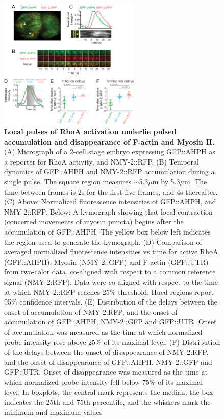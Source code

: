 \begin{figure}[!htbp]
\centering
\includegraphics[width=0.6\textwidth]{pulse/Figure2-4}

\caption{\label{fig:224}\textbf{Local pulses of RhoA activation underlie pulsed accumulation and disappearance of F-actin and Myosin II.} (A) Micrograph of a 2-cell stage embryo expressing GFP::AHPH as a reporter for RhoA activity, and NMY-2::RFP. (B) Temporal dynamics of GFP::AHPH and NMY-2::RFP accumulation during a single pulse. The square region measures $\sim$5.3$\mu$m by 5.3$\mu$m. The time between frames is 2s for the first five frames, and 4s thereafter. (C) Above: Normalized fluorescence intensities of GFP::AHPH, and NMY-2::RFP. Below: A kymograph showing that local contraction (concerted movements of myosin puncta) begins after the accumulation of GFP::AHPH. The yellow box below left indicates the region used to generate the kymograph. (D) Comparison of averaged normalized fluorescence intensities vs time for active RhoA (GFP::AHPH), Myosin (NMY-2::GFP) and F-actin (GFP::UTR) from two-color data, co-aligned with respect to a common reference signal (NMY-2:RFP). Data were co-aligned with respect to the time at which NMY-2::RFP reaches 25$\%$ threshold. Hued regions report 95$\%$ confidence intervals. (E) Distribution of the delays between the onset of accumulation of NMY-2:RFP, and the onset of accumulation of GFP::AHPH, NMY-2::GFP and GFP::UTR. Onset of accumulation was measured as the time at which normalized probe intensity rose above 25$\%$ of its maximal level. (F) Distribution of the delays between the onset of disappearance of NMY-2:RFP, and the onset of disappearance of GFP::AHPH, NMY-2::GFP and GFP::UTR. Onset of disappearance was measured as the time at which normalized probe intensity fell below 75$\%$ of its maximal level. In boxplots, the central mark represents the median, the box indicates the 25th and 75th percentile, and the whiskers mark the minimum and maximum values}\end{figure}


